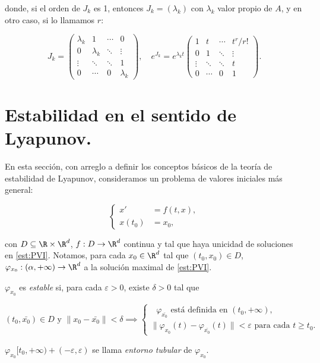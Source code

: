  donde, si el orden de $J_k$ es 1, entonces $J_k=(\lambda_k)$ con $\lambda_k$ valor propio de $A$, y en otro caso, si lo llamamos $r$:
 
 \[J_k=
 \begin{pmatrix}
 \lambda_k & 1  & \cdots & 0 \\
  0        & \lambda_k & \ddots & \vdots \\
  \vdots   & \ddots & \ddots & 1 \\
  0        & \cdots & 0 & \lambda_k
 \end{pmatrix},
 \quad
 e^{J_k} = e^{\lambda_k t}\begin{pmatrix}
 1       & t & \cdots & t^r/r! \\
  0      & 1 & \ddots & \vdots \\
  \vdots & \ddots & \ddots & t \\
  0      & \cdots & 0 & 1
 \end{pmatrix}.
 \]


\section{Estabilidad en el sentido de Lyapunov.}

En esta sección, con arreglo a definir los conceptos básicos de la teoría de estabilidad
de Lyapunov, consideramos un problema de valores iniciales más general:

\begin{equation}
\left\{\begin{array}{rl}
x' &=f(t,x), \\
x(t_0)&=x_0,
\end{array}\right.
\tag{P} \label{est:PVI}
\end{equation}

con $D \subseteq \R \times \R^d$, $f: D \to \R^d$ continua y tal que haya unicidad de soluciones en \ref{est:PVI}.
Notamos, para cada $x_0\in \R^d$ tal que $(t_0,x_0) \in D$, $\varphi_{x_0} : (\alpha, +\infty) \to \R^d$ a la solución maximal de \ref{est:PVI}.

\begin{ndef}
  $\varphi_{x_0}$ es \emph{estable} si, para cada $\varepsilon > 0$, existe $\delta > 0$ tal que

  \[
    (t_0, \bar{x_0}) \in D \text{ y } \|x_0 - \bar{x_0}\| < \delta \implies
  \begin{cases}
    \text{ $\varphi_{\bar{x_0}}$ está definida en $(t_0, +\infty)$}, \\
    \|\varphi_{x_0}(t) - \varphi_{\bar{x_0}}(t)\| < \varepsilon \text{ para cada $t \ge t_0$}.
  \end{cases}
  \]

  $\varphi_{x_0}[t_0, +\infty)+(-\varepsilon, \varepsilon)$ se llama \emph{entorno tubular} de $\varphi_{x_0}$.
\end{ndef}

